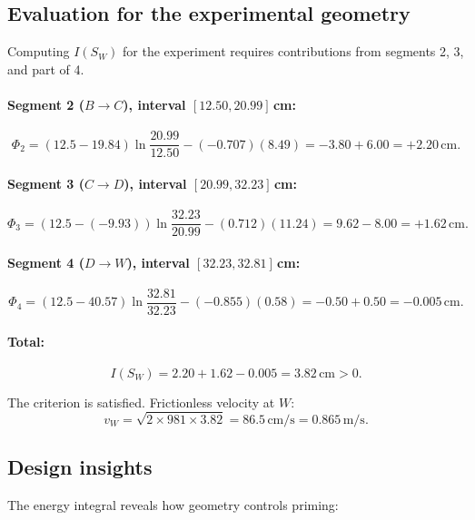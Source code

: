 \documentclass[11pt]{article}
\begin{document}
\subsection{Evaluation for the experimental geometry}

Computing $I(S_W)$ for the experiment requires contributions from segments 2, 3, and part of 4.

\paragraph{Segment 2 ($B \to C$), interval $[12.50, 20.99]$\,cm:}
\[
  \Phi_2 = (12.5 - 19.84)\ln\frac{20.99}{12.50} - (-0.707)(8.49) = -3.80 + 6.00 = +2.20\,\text{cm}.
\]

\paragraph{Segment 3 ($C \to D$), interval $[20.99, 32.23]$\,cm:}
\[
  \Phi_3 = (12.5 - (-9.93))\ln\frac{32.23}{20.99} - (0.712)(11.24) = 9.62 - 8.00 = +1.62\,\text{cm}.
\]

\paragraph{Segment 4 ($D \to W$), interval $[32.23, 32.81]$\,cm:}
\[
  \Phi_4 = (12.5 - 40.57)\ln\frac{32.81}{32.23} - (-0.855)(0.58) = -0.50 + 0.50 = -0.005\,\text{cm}.
\]

\paragraph{Total:}
\begin{equation}
  I(S_W) = 2.20 + 1.62 - 0.005 = 3.82\,\text{cm} > 0.
  \label{eq:I-SW-value}
\end{equation}

The criterion is satisfied. Frictionless velocity at $W$:
\[
  v_W = \sqrt{2 \times 981 \times 3.82} = 86.5\,\text{cm/s} = 0.865\,\text{m/s}.
\]

\subsection{Design insights}

The energy integral reveals how geometry controls priming:
\end{document}
